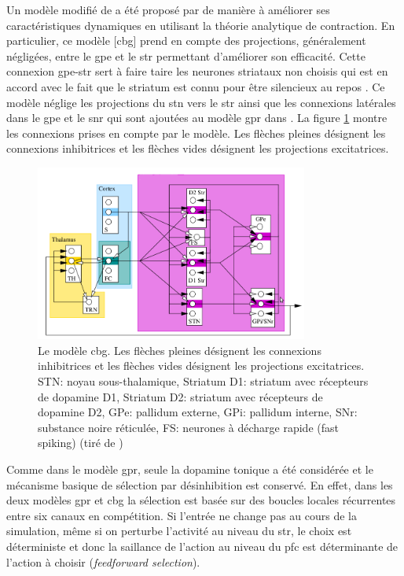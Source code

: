 Un modèle modifié de \cite{Gurney:2001a} a été proposé par \cite {Girard:2008} de manière à améliorer ses caractéristiques dynamiques en utilisant la théorie analytique de contraction. En particulier, ce modèle [\gls{cbg}] prend en compte des projections, généralement négligées, entre le \gls{gpe} et le \gls{str} permettant d'améliorer son efficacité. Cette connexion \gls{gpe}-\gls{str} sert à faire taire les neurones striataux non choisis qui est en accord avec le fait que le striatum est connu pour être silencieux au repos \cite{Delong:1984}. Ce modèle néglige les projections du \gls{stn} vers le \gls{str} \cite{Parent:2000} ainsi que les connexions latérales dans le \gls{gpe} et le \gls{snr} \cite{Deniau:1982, Juraska:1977} qui sont ajoutées au modèle \gls{gpr} dans \cite{Gurney:2004}. La figure \ref{CBG} montre les connexions prises en compte par le modèle. Les flèches pleines désignent les connexions inhibitrices et les flèches vides désignent les projections excitatrices.\\

\begin{figure}
\begin{center}
\includegraphics[width=0.8\textwidth]{figures/ch4_6_CBG}
\end{center}
\caption{Le modèle \protect\gls{cbg}. Les flèches pleines désignent les connexions inhibitrices et les flèches vides désignent les projections excitatrices. STN: noyau sous-thalamique, Striatum D1: striatum avec récepteurs de dopamine D1, Striatum D2: striatum avec récepteurs de dopamine D2, GPe: pallidum externe, GPi: pallidum interne, SNr: substance noire réticulée, FS: neurones à décharge rapide (fast spiking) (tiré de \protect\cite{Girard:2008})}
\label{CBG}
\end{figure}

Comme dans le modèle \gls{gpr}, seule la dopamine tonique a été considérée et le mécanisme basique de sélection par désinhibition est conservé. En effet, dans les deux modèles \gls{gpr} et \gls{cbg} la sélection est basée sur des boucles locales récurrentes entre six canaux en compétition. Si l'entrée ne change pas au cours de la simulation, même si on perturbe l'activité au niveau du \gls{str}, le choix est déterministe et donc la saillance de l'action au niveau du \gls{pfc} est déterminante de l'action à choisir ({\em feedforward selection}). 


